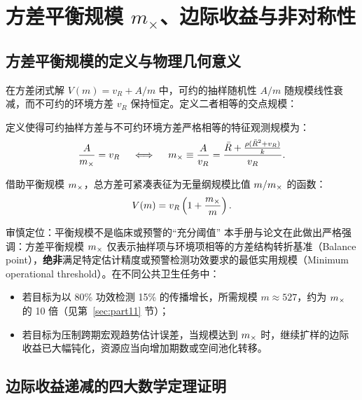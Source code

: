 \section{方差平衡规模 $m_\times$、边际收益与非对称性}
\label{sec:part05}

\subsection{方差平衡规模的定义与物理几何意义}

在方差闭式解 $V(m) = v_R + A/m$ 中，可约的抽样随机性 $A/m$ 随规模线性衰减，而不可约的环境方差 $v_R$ 保持恒定。定义二者相等的交点规模：

\begin{definition}[方差平衡规模 $\mx$]
定义使得可约抽样方差与不可约环境方差严格相等的特征观测规模为：
\begin{equation}
  \frac{A}{m_\times} = v_R \quad \iff \quad m_\times \equiv \frac{A}{v_R} = \frac{\bar{R} + \frac{\rho(\bar{R}^2 + v_R)}{k}}{v_R}.
  \label{eq:mx-def}
\end{equation}
\end{definition}

借助平衡规模 $\mx$，总方差可紧凑表征为无量纲规模比值 $m / m_\times$ 的函数：
\begin{equation}
  V(m) = v_R \left( 1 + \frac{m_\times}{m} \right).
  \label{eq:var-compact}
\end{equation}

\begin{insightbox}{审慎定位：平衡规模不是临床或预警的“充分阈值”}
本手册与论文在此做出严格强调：方差平衡规模 $\mx$ 仅表示抽样项与环境项相等的方差结构转折基准（Balance point），\textbf{绝非}满足特定估计精度或预警检测功效要求的最低实用规模（Minimum operational threshold）。在不同公共卫生任务中：
\begin{itemize}
  \item 若目标为以 80\% 功效检测 15\% 的传播增长，所需规模 $m \approx 527$，约为 $\mx$ 的 10 倍（见第~\ref{sec:part11} 节）；
  \item 若目标为压制跨期宏观趋势估计误差，当规模达到 $\mx$ 时，继续扩样的边际收益已大幅钝化，资源应当向增加期数或空间池化转移。
\end{itemize}
\end{insightbox}

\subsection{边际收益递减的四大数学定理证明}

